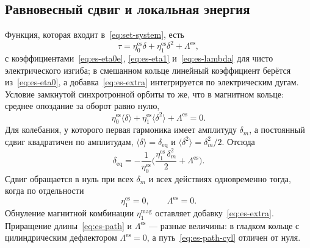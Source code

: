 \subsection{Равновесный сдвиг и локальная энергия}
\label{sec:es-eq}

Функция, которая входит в~\eqref{eq:set-system}, есть
\begin{equation}
\label{eq:es-tau-series}
\tau=\eta_0^{\mathrm{es}}\delta+\eta_1^{\mathrm{es}}\delta^2+\Lambda^{\mathrm{es}},
\end{equation}
с коэффициентами~\eqref{eq:es-eta0e}, \eqref{eq:es-eta1} и~\eqref{eq:es-lambda} для чисто электрического изгиба; в смешанном кольце линейный коэффициент берётся из~\eqref{eq:es-eta0}, а добавка~\eqref{eq:es-extra} интегрируется по электрическим дугам. Условие замкнутой синхротронной орбиты то же, что в магнитном кольце: среднее опоздание за оборот равно нулю,
\begin{equation}
\label{eq:es-mean}
\eta_0^{\mathrm{es}}\langle\delta\rangle+\eta_1^{\mathrm{es}}\langle\delta^2\rangle+\Lambda^{\mathrm{es}}=0.
\end{equation}
Для колебания, у которого первая гармоника имеет амплитуду $\delta_m$, а постоянный сдвиг квадратичен по амплитудам, $\langle\delta\rangle=\delta_{\mathrm{eq}}$ и $\langle\delta^2\rangle=\delta_m^2/2$. Отсюда
\begin{equation}
\label{eq:es-deq}
\delta_{\mathrm{eq}}
=-\frac{1}{\eta_0^{\mathrm{es}}}
\Biggl(
\frac{\eta_1^{\mathrm{es}}\,\delta_m^2}{2}
+\Lambda^{\mathrm{es}}
\Biggr).
\end{equation}
Сдвиг обращается в нуль при всех $\delta_m$ и всех действиях одновременно тогда, когда по отдельности
\begin{equation}
\label{eq:es-zero}
\eta_1^{\mathrm{es}}=0,
\qquad
\Lambda^{\mathrm{es}}=0.
\end{equation}
Обнуление магнитной комбинации $\eta_1^{\mathrm{mag}}$ оставляет добавку~\eqref{eq:es-extra}. Приращение длины~\eqref{eq:es-path} и $\Lambda^{\mathrm{es}}$ --- разные величины: в гладком кольце с цилиндрическим дефлектором $\Lambda^{\mathrm{es}}=0$, а путь~\eqref{eq:es-path-cyl} отличен от нуля.

